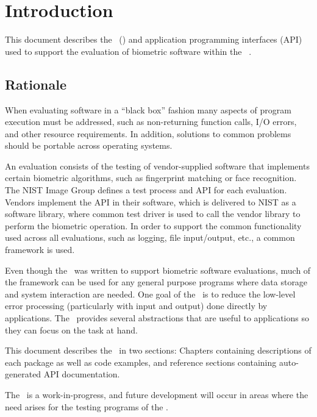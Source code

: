 \chapter{Introduction}

This document describes the \lname\ (\sname) and application programming 
interfaces (API) used to support the evaluation of biometric software within 
the \nistig\ \cite{org:nist:imagegroup}.

\section{Rationale}

When evaluating software in a ``black box'' fashion many aspects
of program execution must be addressed, such as non-returning function calls,
I/O errors, and other resource requirements. In addition, solutions to common
problems should be portable across operating systems.

An evaluation consists of the testing of vendor-supplied
software that implements certain biometric algorithms, such as fingerprint
matching or face recognition. The NIST Image Group defines a test process
and API for each evaluation. Vendors implement the API in their software, which
is delivered to NIST as a software library, where common test driver is used to
call the vendor library to perform the biometric operation.
In order to support the common functionality used across all evaluations, such
as logging, file input/output, etc., a common framework is used.

Even though the \lname\ was written to support biometric software evaluations,
much of the framework can be used for any general purpose programs where data
storage and system interaction are needed. One goal of the \sname\ is to
reduce the low-level error processing (particularly with input and output)
done directly by applications. The \lname\ provides several abstractions that
are useful to applications so they can focus on the task at hand.

This document describes the \sname\ in two sections: Chapters containing
descriptions of each package as well as code examples, and reference sections
containing auto-generated API documentation.

The \sname\ is a work-in-progress, and future development will occur in areas
where the need arises for the testing programs of the \nistig.
